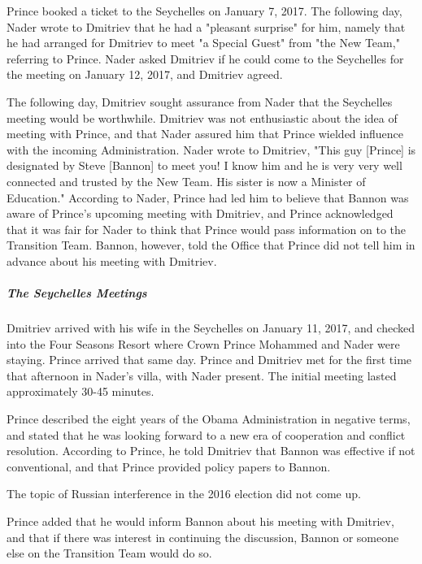 Prince booked a ticket to the Seychelles on January 7, 2017.%
The following day, Nader wrote to Dmitriev that he had a "pleasant surprise" for him, namely that he had arranged for Dmitriev to meet "a Special Guest" from "the New Team," referring to Prince.%
Nader asked Dmitriev if he could come to the Seychelles for the meeting on January 12, 2017, and Dmitriev agreed.%

The following day, Dmitriev sought assurance from Nader that the Seychelles meeting would be worthwhile.%
Dmitriev was not enthusiastic about the idea of meeting with Prince, and that Nader assured him that Prince wielded influence with the incoming Administration.%
Nader wrote to Dmitriev, "This guy [Prince] is designated by Steve [Bannon] to meet you!
I know him and he is very very well connected and trusted by the New Team.
His sister is now a Minister of Education."%
According to Nader, Prince had led him to believe that Bannon was aware of Prince's upcoming meeting with Dmitriev, and Prince acknowledged that it was fair for Nader to think that Prince would pass information on to the Transition Team.%
Bannon, however, told the Office that Prince did not tell him in advance about his meeting with Dmitriev.%

\subparagraph{The Seychelles Meetings}

Dmitriev arrived with his wife in the Seychelles on January 11, 2017, and checked into the Four Seasons Resort where Crown Prince Mohammed and Nader were staying.%
Prince arrived that same day.%
Prince and Dmitriev met for the first time that afternoon in Nader's villa, with Nader present.%
The initial meeting lasted approximately 30-45 minutes.%

Prince described the eight years of the Obama Administration in negative terms, and stated that he was looking forward to a new era of cooperation and conflict resolution.%
According to Prince, he told Dmitriev that Bannon was effective if not conventional, and that Prince provided policy papers to Bannon.%

The topic of Russian interference in the 2016 election did not come up.%

Prince added that he would inform Bannon about his meeting with Dmitriev, and that if there was interest in continuing the discussion, Bannon or someone else on the Transition Team would do so.%

